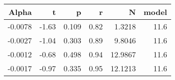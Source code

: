 \begin{table}[ht]
\centering
\begin{tabular}{rrrrrr}
  \hline
Alpha & t & p & r & N & model \\ 
  \hline
-0.0078 & -1.63 & 0.109 & 0.82 & 1.3218 & 11.6 \\ 
  -0.0027 & -1.04 & 0.303 & 0.89 & 9.8046 & 11.6 \\ 
  -0.0012 & -0.68 & 0.498 & 0.94 & 12.9867 & 11.6 \\ 
  -0.0017 & -0.97 & 0.335 & 0.95 & 12.1213 & 11.6 \\ 
   \hline
\end{tabular}
\end{table}

